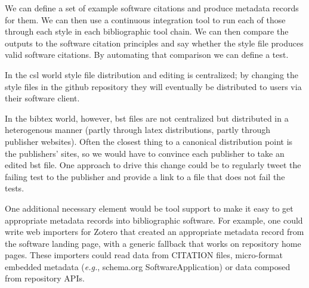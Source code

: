 \documentclass[a4paper,UKenglish]{dagman}
\newcommand{\eg}{\emph{e.g.},\xspace}
\begin{document}
We can define a set of example software citations and produce metadata records for them. We can then use a continuous integration tool to run each of those through each style in each bibliographic tool chain. We can then compare the outputs to the software citation principles and say whether the style file produces valid software citations. By automating that comparison we can define a test.

In the csl world style file distribution and editing is centralized; by changing the style files in the github repository they will eventually be distributed to users via their software client.

In the bibtex world, however, bst files are not centralized but distributed in a heterogenous manner (partly through latex distributions, partly through publisher websites). Often the closest thing to a canonical distribution point is the publishers' sites, so we would have to convince each publisher to take an edited bst file.  One approach to drive this change could be to regularly tweet the failing test to the publisher and provide a link to a file that does not fail the tests.

One additional necessary element would be tool support to make it easy to get appropriate metadata records into bibliographic software. For example, one could write web importers for Zotero that created an appropriate metadata record from the software landing page, with a generic fallback that works on repository home pages. These importers could read data from CITATION files, micro-format embedded metadata (\eg schema.org SoftwareApplication) or data composed from repository APIs.
\end{document}
